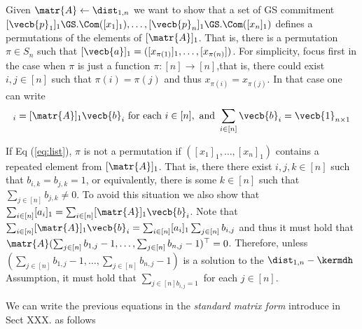 Given $\matr{A}\gets\dist_{1,n}$ we want to show that a set of GS commitment $[\vecb{p}_1]_1\GS.\Com([x_1]_1),\ldots,[\vecb{p}_n]_1\GS.\Com([x_n]_1)$ defines a permutations of the elements of $[\matr{A}]_1$. That is, there is a permutation $\pi\in S_n$ such that $[\vecb{a}]_1=([x_{\pi(1)}]_1,\ldots,[x_{\pi(n)}])$. For simplicity, focus first in the case when $\pi$ is just a function $\pi:[n]\to[n]$,that is, there could exist $i,j\in[n]$ such that $\pi(i)=\pi(j)$ and thus $x_{\pi(i)}=x_{\pi(j)}$. In that case one can write
\begin{equation}
[x_1]_i = [\matr{A}]_1\vecb{b}_i \text{ for each } i\in[n],\text{ and } \sum_{i\in[n]} \vecb{b}_i=\vecb{1}_{n\times 1} \label{eq:list}
\end{equation}

If Eq (\ref{eq:list}), $\pi$ is not a permutation if $([x_1]_1,\ldots,[x_n]_1)$ contains a repeated element from $[\matr{A}]_1$. That is, there there exist $i,j,k\in[n]$ such that $b_{i,k}=b_{j,k}=1$, or equivalently, there is some $k\in[n]$ such that $\sum_{j\in[n]}b_{j,k}\neq 0$. To avoid this situation we also show that $\sum_{i\in[n]}[a_i]_1=\sum_{i\in[n]}[\matr{A}]_1\vecb{b}_i$. Note that $\sum_{i\in[n]}[\matr{A}]_1\vecb{b}_i=\sum_{i\in[n]}[a_i]_1\sum_{j\in[n]}b_{i,j}$ and thus it must hold that $\matr{A}(\sum_{j\in[n]}b_{1,j}-1,\ldots,\sum_{j\in[n]}b_{n,j}-1)^\top=0$. Therefore, unless $(\sum_{j\in[n]}b_{1,j}-1,\ldots,\sum_{j\in[n]}b_{n,j}-1)$ is a solution to the $\dist_{1,n}-\kermdh$ Assumption, it must hold that $\sum_{j\in[n]b_{i,j}=1}$ for each $j\in[n]$.

We can write the previous equations in the \emph{standard matrix form} introduce in Sect XXX. as follows

